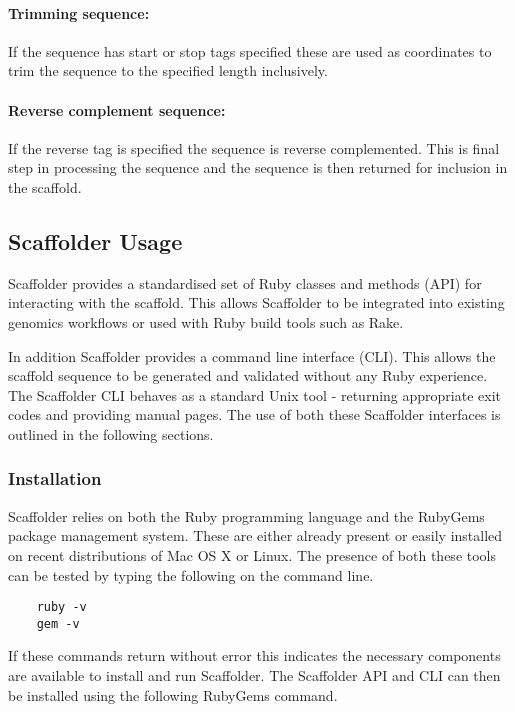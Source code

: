 \documentclass[10pt]{bmc_article}
\newenvironment{bmcformat}{\begin{raggedright}\baselineskip20pt\sloppy\setboolean{publ}{false}}{\end{raggedright}\baselineskip20pt\sloppy}
\begin{document}
\begin{bmcformat}
\paragraph{Trimming sequence:} If the sequence has start or stop tags
specified these are used as coordinates to trim the sequence to the specified
length inclusively. \pb 

\paragraph{Reverse complement sequence:} If the reverse tag is specified the
sequence is reverse complemented. This is final step in processing the
sequence and the sequence is then returned for inclusion in the scaffold. \pb

\subsection*{Scaffolder Usage} %

Scaffolder provides a standardised set of Ruby classes and methods (API) for
interacting with the scaffold. This allows Scaffolder to be integrated into
existing genomics workflows or used with Ruby build tools such as Rake. \pb

In addition Scaffolder provides a command line interface (CLI). This allows
the scaffold sequence to be generated and validated without any Ruby
experience. The Scaffolder CLI behaves as a standard Unix tool - returning
appropriate exit codes and providing manual pages. The use of both these
Scaffolder interfaces is outlined in the following sections. \pb

\subsubsection*{Installation} %

Scaffolder relies on both the Ruby programming language and the RubyGems
package management system. These are either already present or easily installed
on recent distributions of Mac OS X or Linux. The presence of both these tools
can be tested by typing the following on the command line. \pb

  \begin{verbatim}
    ruby -v
    gem -v
  \end{verbatim}

If these commands return without error this indicates the necessary components
are available to install and run Scaffolder. The Scaffolder API and CLI can
then be installed using the following RubyGems command. \pb


\end{bmcformat}
\end{document}
